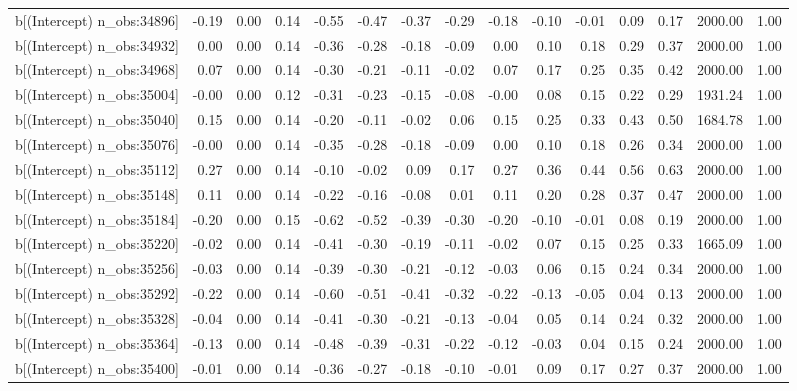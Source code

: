 \begin{table}[ht]
\begin{tabular}{rrrrrrrrrrrrrrr}
  b[(Intercept) n\_obs:34896] & -0.19 & 0.00 & 0.14 & -0.55 & -0.47 & -0.37 & -0.29 & -0.18 & -0.10 & -0.01 & 0.09 & 0.17 & 2000.00 & 1.00 \\ 
  b[(Intercept) n\_obs:34932] & 0.00 & 0.00 & 0.14 & -0.36 & -0.28 & -0.18 & -0.09 & 0.00 & 0.10 & 0.18 & 0.29 & 0.37 & 2000.00 & 1.00 \\ 
  b[(Intercept) n\_obs:34968] & 0.07 & 0.00 & 0.14 & -0.30 & -0.21 & -0.11 & -0.02 & 0.07 & 0.17 & 0.25 & 0.35 & 0.42 & 2000.00 & 1.00 \\ 
  b[(Intercept) n\_obs:35004] & -0.00 & 0.00 & 0.12 & -0.31 & -0.23 & -0.15 & -0.08 & -0.00 & 0.08 & 0.15 & 0.22 & 0.29 & 1931.24 & 1.00 \\ 
  b[(Intercept) n\_obs:35040] & 0.15 & 0.00 & 0.14 & -0.20 & -0.11 & -0.02 & 0.06 & 0.15 & 0.25 & 0.33 & 0.43 & 0.50 & 1684.78 & 1.00 \\ 
  b[(Intercept) n\_obs:35076] & -0.00 & 0.00 & 0.14 & -0.35 & -0.28 & -0.18 & -0.09 & 0.00 & 0.10 & 0.18 & 0.26 & 0.34 & 2000.00 & 1.00 \\ 
  b[(Intercept) n\_obs:35112] & 0.27 & 0.00 & 0.14 & -0.10 & -0.02 & 0.09 & 0.17 & 0.27 & 0.36 & 0.44 & 0.56 & 0.63 & 2000.00 & 1.00 \\ 
  b[(Intercept) n\_obs:35148] & 0.11 & 0.00 & 0.14 & -0.22 & -0.16 & -0.08 & 0.01 & 0.11 & 0.20 & 0.28 & 0.37 & 0.47 & 2000.00 & 1.00 \\ 
  b[(Intercept) n\_obs:35184] & -0.20 & 0.00 & 0.15 & -0.62 & -0.52 & -0.39 & -0.30 & -0.20 & -0.10 & -0.01 & 0.08 & 0.19 & 2000.00 & 1.00 \\ 
  b[(Intercept) n\_obs:35220] & -0.02 & 0.00 & 0.14 & -0.41 & -0.30 & -0.19 & -0.11 & -0.02 & 0.07 & 0.15 & 0.25 & 0.33 & 1665.09 & 1.00 \\ 
  b[(Intercept) n\_obs:35256] & -0.03 & 0.00 & 0.14 & -0.39 & -0.30 & -0.21 & -0.12 & -0.03 & 0.06 & 0.15 & 0.24 & 0.34 & 2000.00 & 1.00 \\ 
  b[(Intercept) n\_obs:35292] & -0.22 & 0.00 & 0.14 & -0.60 & -0.51 & -0.41 & -0.32 & -0.22 & -0.13 & -0.05 & 0.04 & 0.13 & 2000.00 & 1.00 \\ 
  b[(Intercept) n\_obs:35328] & -0.04 & 0.00 & 0.14 & -0.41 & -0.30 & -0.21 & -0.13 & -0.04 & 0.05 & 0.14 & 0.24 & 0.32 & 2000.00 & 1.00 \\ 
  b[(Intercept) n\_obs:35364] & -0.13 & 0.00 & 0.14 & -0.48 & -0.39 & -0.31 & -0.22 & -0.12 & -0.03 & 0.04 & 0.15 & 0.24 & 2000.00 & 1.00 \\ 
  b[(Intercept) n\_obs:35400] & -0.01 & 0.00 & 0.14 & -0.36 & -0.27 & -0.18 & -0.10 & -0.01 & 0.09 & 0.17 & 0.27 & 0.37 & 2000.00 & 1.00 \\ 

\end{tabular}
\end{table}
